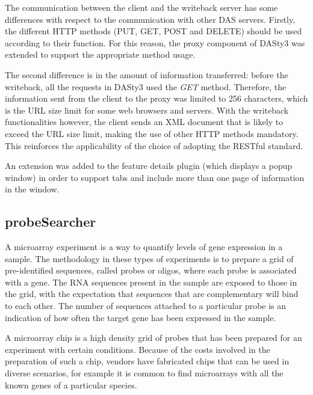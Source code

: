 The communication between the client and the writeback server has some differences with respect to the communication with other DAS servers. Firstly, the different HTTP methods (PUT, GET, POST and DELETE) should be used according to their function. For this reason, the proxy component of DASty3 was extended to support the appropriate method usage. 

The second difference is in the amount of information transferred: before the writeback, all the requests in DASty3 used the \emph{GET} method. Therefore, the information sent from the client to the proxy was limited to 256 characters, which is the URL size limit for some web browsers and servers. With the writeback functionalities however, the client sends an XML document that is likely to exceed the URL size limit, making the use of other HTTP methods mandatory. This reinforces the applicability of the choice of adopting the RESTful standard. 

An extension was added to the feature details plugin (which displays a popup window) in order to support tabs and include more than one page of information in the window.

\subsection{probeSearcher}

A microarray experiment is a way to quantify levels of gene expression in a sample. The methodology in these types of experiments is to prepare a grid of pre-identified sequences, called probes or oligos, where each probe is associated with a gene. The RNA sequences present in the sample are exposed to those in the grid, with the expectation that sequences that are complementary  will bind to each other. The number of sequences attached to a particular probe is an indication of how often the target gene has been expressed in the sample.

A microarray chip is a high density grid of probes that has been prepared for an experiment with certain conditions. Because of the costs involved in the preparation of such a chip, vendors have fabricated chips that can be used in diverse scenarios, for example it is common to find microarrays with all the known genes of a particular species.

